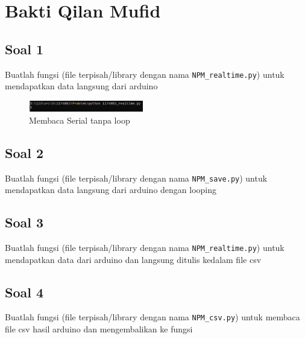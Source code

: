 \section{Bakti Qilan Mufid}
\subsection{Soal 1}
Buatlah fungsi (file terpisah/library dengan nama \verb|NPM_realtime.py|) untuk mendapatkan data langsung dari arduino


\begin{figure}[ht!]
	\includegraphics[width=5cm]{figures/5/1174083/Praktek/1.png}
	\centering
	\caption{Membaca Serial tanpa loop}
\end{figure}

\subsection{Soal 2}
Buatlah fungsi (file terpisah/library dengan nama \verb|NPM_save.py|) untuk mendapatkan data langsung dari arduino dengan looping




\subsection{Soal 3}
Buatlah fungsi (file terpisah/library dengan nama \verb|NPM_realtime.py|) untuk mendapatkan data dari arduino dan langsung ditulis kedalam file csv





\subsection{Soal 4}
Buatlah fungsi (file terpisah/library dengan nama \verb|NPM_csv.py|) untuk membaca file csv hasil arduino dan mengembalikan ke fungsi



